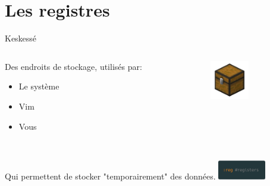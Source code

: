 \documentclass[10pt]{beamer}
\begin{document}
\section{Les registres}
	\begin{frame}{Keskessé}
		\begin{columns}[C]
			\begin{column}{0.50\textwidth}
				Des endroits de stockage, utilisés par:\\
				\begin{itemize}
					\item Le système
					\item Vim
					\item Vous
				\end{itemize}
			\end{column}
			\begin{column}{0.47\textwidth}
				\center
				\includegraphics[width=64]{img/chest.png}
			\end{column}
		\end{columns}

		\\
		\vspace*{0.4in}%
		Qui permettent de stocker "temporairement" des données.
		\center
		\includegraphics[height=32]{img/registers.png}
	\end{frame}
\end{document}

